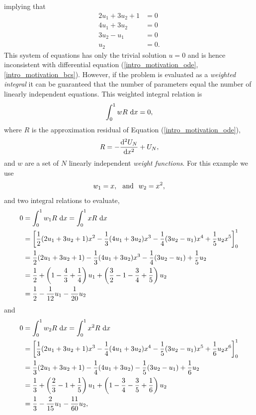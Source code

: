 implying that
\begin{align*}
  2u_1 + 3u_2 + 1 &= 0 \\
  4u_1 + 3u_2 &= 0 \\
  3u_2 - u_1 &= 0 \\
  u_2 &= 0.
\end{align*}
This system of equations has only the trivial solution $u=0$ and is hence inconsistent with differential equation (\ref{intro_motivation_ode}, \ref{intro_motivation_bcs}).  However, if the problem is evaluated as a \emph{weighted integral} it can be guaranteed that the number of parameters equal the number of linearly independent equations.  This weighted integral relation is
$$\int_0^1 w R \d{x} = 0,$$
where $R$ is the approximation residual of Equation (\ref{intro_motivation_ode}),
$$R = - \totder[2]{U_N}{x} + U_N,$$
and $w$ are a set of $N$ linearly independent \emph{weight functions}.  For this example we use
$$w_1 = x, \hspace{2.5mm} \text{and} \hspace{2.5mm} w_2 = x^2,$$
and two integral relations to evaluate,
{\scriptsize
\begin{align*}
  0 &= \int_0^1 w_1 R \d{x} = \int_0^1 x R \d{x} \\
    &= \left[ \frac{1}{2}(2u_1 + 3u_2 + 1)x^2 - \frac{1}{3}(4u_1 + 3u_2)x^3 - \frac{1}{4}(3u_2 - u_1)x^4 + \frac{1}{5}u_2x^5 \right]_0^1 \\
    &= \frac{1}{2}(2u_1 + 3u_2 + 1) - \frac{1}{3}(4u_1 + 3u_2)x^3 - \frac{1}{4}(3u_2 - u_1) + \frac{1}{5}u_2 \\
    &= \frac{1}{2} + \left( 1 - \frac{4}{3} + \frac{1}{4} \right) u_1 + \left( \frac{3}{2} - 1 - \frac{3}{4} + \frac{1}{5} \right) u_2 \\
    &= \frac{1}{2} - \frac{1}{12} u_1 - \frac{1}{20} u_2
\end{align*}}
and
{\scriptsize
\begin{align*}
  0 &= \int_0^1 w_2 R \d{x} = \int_0^1 x^2 R \d{x} \\
    &= \left[ \frac{1}{3}(2u_1 + 3u_2 + 1)x^3 - \frac{1}{4}(4u_1 + 3u_2)x^4 - \frac{1}{5}(3u_2 - u_1)x^5 + \frac{1}{6}u_2x^6 \right]_0^1 \\
    &= \frac{1}{3}(2u_1 + 3u_2 + 1) - \frac{1}{4}(4u_1 + 3u_2) - \frac{1}{5}(3u_2 - u_1) + \frac{1}{6}u_2 \\
    &= \frac{1}{3} + \left( \frac{2}{3} - 1 + \frac{1}{5} \right) u_1 + \left( 1 - \frac{3}{4} - \frac{3}{5} + \frac{1}{6} \right) u_2 \\
    &= \frac{1}{3} - \frac{2}{15} u_1 - \frac{11}{60} u_2,
\end{align*}}
